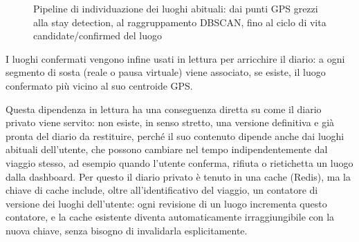 \documentclass[conference]{IEEEtran}
\begin{document}
\begin{figure}[htbp]
\centering
{}
\caption{Pipeline di individuazione dei luoghi abituali: dai punti GPS
grezzi alla stay detection, al raggruppamento DBSCAN, fino al ciclo di
vita candidate/confirmed del luogo}
\label{fig:place-mining}
\end{figure}

I luoghi confermati vengono infine usati in lettura per arricchire il
diario: a ogni segmento di sosta (reale o pausa virtuale) viene
associato, se esiste, il luogo confermato più vicino al suo centroide
GPS.

Questa dipendenza in lettura ha una conseguenza diretta su come il
diario privato viene servito: non esiste, in senso stretto, una
versione definitiva e già pronta del diario da restituire, perché il
suo contenuto dipende anche dai luoghi abituali dell'utente, che
possono cambiare nel tempo indipendentemente dal viaggio stesso, ad
esempio quando l'utente conferma, rifiuta o rietichetta un luogo dalla
dashboard. Per questo il diario privato è tenuto in una cache (Redis),
ma la chiave di cache include, oltre all'identificativo del viaggio,
un contatore di versione dei luoghi dell'utente: ogni revisione di un
luogo incrementa questo contatore, e la cache esistente diventa
automaticamente irraggiungibile con la nuova chiave, senza bisogno di
invalidarla esplicitamente.
\end{document}
